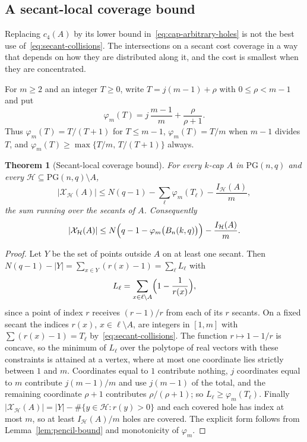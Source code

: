 \documentclass[11pt]{article}
\newtheorem{theorem}{Theorem}[section]
\theoremstyle{definition}
\theoremstyle{remark}
\newcommand{\PG}{\mathrm{PG}}
\newcommand{\cH}{\mathcal{H}}
\newcommand{\cX}{\mathcal{X}}
\newcommand{\IH}{I_{\cH}}
\begin{document}
\subsection{A secant-local coverage bound}

Replacing $c_4(A)$ by its lower bound in~\eqref{eq:cap-arbitrary-holes} is
not the best use of~\eqref{eq:secant-collisions}.  The intersections on a
secant cost coverage in a way that depends on how they are distributed
along it, and the cost is smallest when they are concentrated.

For $m\ge2$ and an integer $T\ge0$, write $T=j(m-1)+\rho$ with
$0\le\rho<m-1$ and put
\[
 \varphi_m(T)=j\,\frac{m-1}{m}+\frac{\rho}{\rho+1}.
\]
Thus $\varphi_m(T)=T/(T+1)$ for $T\le m-1$, $\varphi_m(T)=T/m$ when
$m-1$ divides $T$, and $\varphi_m(T)\ge\max\{T/m,\,T/(T+1)\}$ always.

\begin{theorem}[Secant-local coverage bound]
\label{thm:secant-local-coverage}
For every $k$-cap $A$ in $\PG(n,q)$ and every $\cH\subseteq\PG(n,q)\setminus A$,
\begin{equation}
 |\cX_{\cH}(A)|\le
 N(q-1)-\sum_{\ell}\varphi_m(T_\ell)-\frac{\IH(A)}m,
\label{eq:secant-local}
\end{equation}
the sum running over the secants of $A$.  Consequently
\begin{equation}
 |\cX_{\cH}(A)|\le
 N\Bigl(q-1-\varphi_m\bigl(B_n(k,q)\bigr)\Bigr)-\frac{\IH(A)}m.
\label{eq:secant-local-explicit}
\end{equation}
\end{theorem}

\begin{proof}
Let $Y$ be the set of points outside $A$ on at least one secant.  Then
$N(q-1)-|Y|=\sum_{x\in Y}(r(x)-1)=\sum_\ell L_\ell$ with
\[
 L_\ell=\sum_{x\in\ell\setminus A}\Bigl(1-\frac1{r(x)}\Bigr),
\]
since a point of index $r$ receives $(r-1)/r$ from each of its $r$
secants.  On a fixed secant the indices $r(x)$, $x\in\ell\setminus A$,
are integers in $[1,m]$ with $\sum(r(x)-1)=T_\ell$
by~\eqref{eq:secant-collisions}.  The function $r\mapsto1-1/r$ is concave,
so the minimum of $L_\ell$ over the polytope of real vectors with these
constraints is attained at a vertex, where at most one coordinate lies
strictly between $1$ and $m$.  Coordinates equal to $1$ contribute nothing,
$j$ coordinates equal to $m$ contribute $j(m-1)/m$ and use $j(m-1)$ of the
total, and the remaining coordinate $\rho+1$ contributes $\rho/(\rho+1)$;
so $L_\ell\ge\varphi_m(T_\ell)$.  Finally
$|\cX_{\cH}(A)|=|Y|-\#\{y\in\cH:r(y)>0\}$ and each covered hole has index
at most $m$, so at least $\IH(A)/m$ holes are covered.  The explicit
form follows from Lemma~\ref{lem:pencil-bound} and monotonicity of
$\varphi_m$.
\end{proof}
\end{document}
